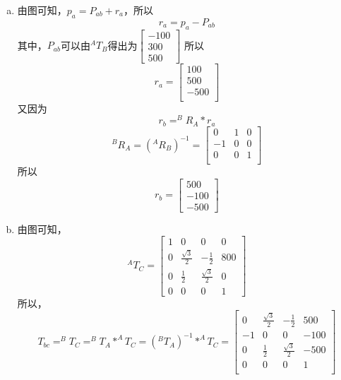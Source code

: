 \begin{enumerate}[(a)]
    \item 
    由图可知，\(p_a = P_{ab} + r_a\)，所以\[r_a = p_a - P_{ab}\]
    其中，\(P_{ab}\)可以由\(^AT_B\)得出为\(\begin{bmatrix} -100\\300\\500 \end{bmatrix}\)
    所以\[r_a = \begin{bmatrix}100\\500\\-500 \\ \end{bmatrix}\]
    又因为
    \[r_b = ^BR_A*r_a\]
    \[^BR_A={(^AR_B)}^{-1}= \begin{bmatrix} 0 & 1 & 0  \\ -1 & 0 & 0  \\ 0 & 0 & 1 \\ \end{bmatrix}\]
    所以\[r_b = \begin{bmatrix}
        500 \\ -100 \\ -500
    \end{bmatrix}\]
    \item 
    由图可知，\[^AT_C = \begin{bmatrix}
        1 & 0 & 0 & 0\\
        0 & \frac{\sqrt{3}}{2} & -\frac{1}{2} & 800\\
        0 & \frac{1}{2} & \frac{\sqrt{3}}{2} & 0\\
        0 & 0 & 0 & 1
    \end{bmatrix}\]
    所以，\[T_{bc} = ^BT_C = ^BT_A * ^AT_C = (^BT_A)^{-1} * ^AT_C = \begin{bmatrix}
        0 & \frac{\sqrt{3}}{2} & -\frac{1}{2} & 500\\
        -1 & 0 & 0 & -100 \\
        0 & \frac12 & \frac{\sqrt{3}}{2} & -500 \\
        0 & 0 & 0 & 1\\
    \end{bmatrix}\]
\end{enumerate}
